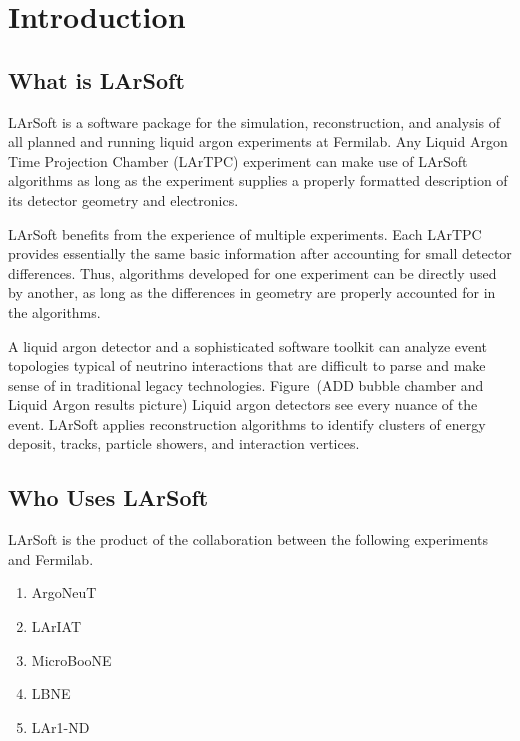 \documentclass[12pt]{elsarticle}
\begin{document}
\maketitle
{}
\section{Introduction}
\subsection{What is LArSoft}
LArSoft is a software package for the simulation, reconstruction, and analysis of all planned and running liquid argon experiments at Fermilab. Any Liquid Argon Time Projection Chamber (LArTPC) experiment can make use of LArSoft algorithms as long as the experiment supplies a properly formatted description of its detector geometry and electronics. 

LArSoft  benefits from the experience of multiple experiments.  Each LArTPC provides essentially the same basic information after accounting for small detector differences.  Thus, algorithms developed for one experiment can be directly used by another, as long as the differences in geometry are properly accounted for in the algorithms.  

A liquid argon detector and a sophisticated software toolkit can analyze event topologies typical of neutrino interactions that are difficult to parse and make sense of in traditional legacy technologies. Figure~(ADD bubble chamber and Liquid Argon results picture)
Liquid argon detectors see every nuance of the event. LArSoft applies reconstruction algorithms to identify clusters of energy deposit, tracks, particle showers, and interaction vertices.

\subsection{Who Uses LArSoft}
LArSoft is the product of the collaboration between the following experiments and Fermilab.
\begin{enumerate}
\item ArgoNeuT
\item LArIAT
\item MicroBooNE
\item LBNE
\item LAr1-ND
\end{enumerate}
\end{document}
